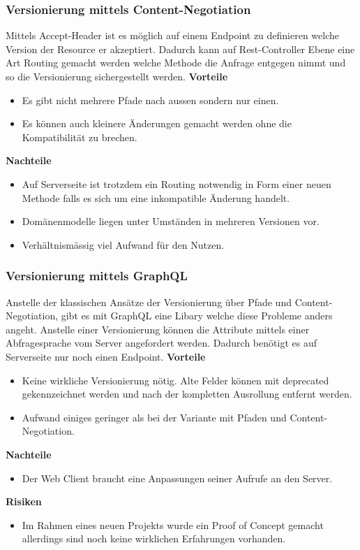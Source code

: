 \subsubsection{Versionierung mittels Content-Negotiation}

Mittels Accept-Header ist es möglich auf einem Endpoint zu definieren welche Version der Resource er akzeptiert. Dadurch kann auf Rest-Controller Ebene eine Art Routing gemacht werden welche Methode die Anfrage entgegen nimmt und so die Versionierung sichergestellt werden.
\newline
\newline
\textbf{Vorteile}
\begin{itemize}
	\item Es gibt nicht mehrere Pfade nach aussen sondern nur einen.
	\item Es können auch kleinere Änderungen gemacht werden ohne die Kompatibilität zu brechen.
\end{itemize}
\textbf{Nachteile}
\begin{itemize}
	\item Auf Serverseite ist trotzdem ein Routing notwendig in Form einer neuen Methode falls es sich um eine inkompatible Änderung handelt.
	\item Domänenmodelle liegen unter Umständen in mehreren Versionen vor.
	\item Verhältnismässig viel Aufwand für den Nutzen.
\end{itemize}

\subsubsection{Versionierung mittels GraphQL}

Anstelle der klassischen Ansätze der Versionierung über Pfade und Content-Negotiation, gibt es mit GraphQL eine Libary welche diese Probleme anders angeht. Anstelle einer Versionierung können die Attribute mittels einer Abfragesprache vom Server angefordert werden. Dadurch benötigt es auf Serverseite nur noch einen Endpoint.
\newline
\newline
\textbf{Vorteile}
\begin{itemize}
	\item Keine wirkliche Versionierung nötig. Alte Felder können mit deprecated gekennzeichnet werden und nach der kompletten Ausrollung entfernt werden.
	\item Aufwand einiges geringer als bei der Variante mit Pfaden und Content-Negotiation.
\end{itemize}
\textbf{Nachteile}
\begin{itemize}
	\item Der Web Client braucht eine Anpassungen seiner Aufrufe an den Server.
\end{itemize}
\textbf{Risiken}
\begin{itemize}
	\item Im Rahmen eines neuen Projekts wurde ein Proof of Concept gemacht allerdings sind noch keine wirklichen Erfahrungen vorhanden.
\end{itemize}

